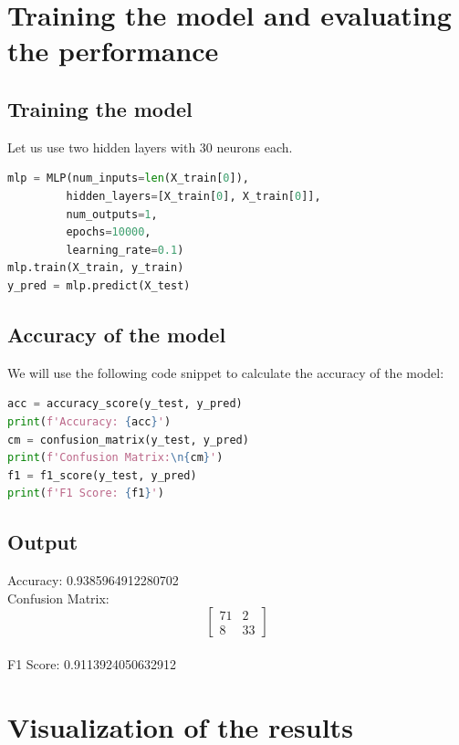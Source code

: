 \section{Training the model and evaluating the performance}
\subsection{Training the model}
Let us use two hidden layers with 30 neurons each.
\begin{lstlisting}[language=Python]
mlp = MLP(num_inputs=len(X_train[0]),
         hidden_layers=[X_train[0], X_train[0]], 
         num_outputs=1, 
         epochs=10000, 
         learning_rate=0.1)
mlp.train(X_train, y_train)
y_pred = mlp.predict(X_test)
\end{lstlisting}
\subsection{Accuracy of the model}
We will use the following code snippet to calculate the accuracy of the model:
\begin{lstlisting}[language=Python]
acc = accuracy_score(y_test, y_pred)
print(f'Accuracy: {acc}')
cm = confusion_matrix(y_test, y_pred)
print(f'Confusion Matrix:\n{cm}')
f1 = f1_score(y_test, y_pred)
print(f'F1 Score: {f1}')
\end{lstlisting}
\subsection{Output}
Accuracy: 0.9385964912280702\\
Confusion Matrix:
$$
\begin{bmatrix}
71 & 2 \\
8 & 33
\end{bmatrix}
$$\\
F1 Score: 0.9113924050632912

\section{Visualization of the results}
